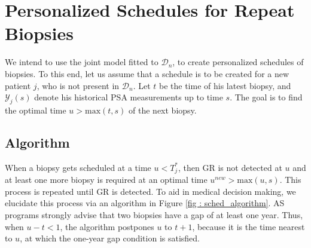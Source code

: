 \section{Personalized Schedules for Repeat Biopsies}
\label{sec : pers_sched_approaches}
We intend to use the joint model fitted to $\mathcal{D}_n$, to create personalized schedules of biopsies. To this end, let us assume that a schedule is to be created for a new patient $j$, who is not present in $\mathcal{D}_n$. Let $t$ be the time of his latest biopsy, and $\mathcal{Y}_j(s)$ denote his historical PSA measurements up to time $s$. The goal is to find the optimal time $u > \mbox{max}(t,s)$ of the next biopsy.





\subsection{Algorithm}
\label{subsec : pers_sched_algorithm}
When a biopsy gets scheduled at a time $u < T^*_j$, then GR is not detected at $u$ and at least one more biopsy is required at an optimal time $u^{new} > \mbox{max}(u,s)$. This process is repeated until GR is detected. To aid in medical decision making, we elucidate this process via an algorithm in Figure \ref{fig : sched_algorithm}. AS programs strongly advise that two biopsies have a gap of at least one year. Thus, when $u - t < 1$, the algorithm postpones $u$ to $t + 1$, because it is the time nearest to $u$, at which the one-year gap condition is satisfied.



\begin{figure*}
\centerline{}
\caption{Algorithm for creating a personalized schedule for patient $j$. The time of the latest biopsy is denoted by $t$. The time of the latest available PSA measurement is denoted by $s$. The proposed personalized time of biopsy is denoted by $u$.  The time at which a repeat biopsy was proposed on the last visit to the hospital is denoted by $u^{pv}$. The time of the next visit for the measurement of PSA is denoted by $s^{nv}$. This figure appears in color in the electronic version of this article.} 
\label{fig : sched_algorithm}
\end{figure*}